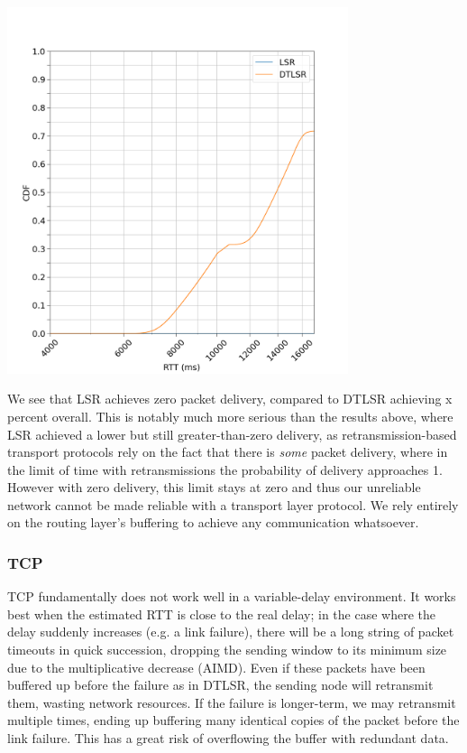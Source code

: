 \documentclass[10pt,twoside,a4paper]{article}
\begin{document}
\begin{minipage}{1\textwidth} \centering
	\includegraphics[width=0.75\textwidth]{delay_full_partition_flap5}
\end{minipage}

We see that LSR achieves zero packet delivery, compared to DTLSR achieving x percent overall. This is notably much more serious than the results above, where LSR achieved a lower but still greater-than-zero delivery, as retransmission-based transport protocols rely on the fact that there is \textit{some} packet delivery, where in the limit of time with retransmissions the probability of delivery approaches 1. However with zero delivery, this limit stays at zero and thus our unreliable network cannot be made reliable with a transport layer protocol. We rely entirely on the routing layer's buffering to achieve any communication whatsoever.

\subsubsection{TCP}

TCP fundamentally does not work well in a variable-delay environment. It works best when the estimated RTT is close to the real delay; in the case where the delay suddenly increases (e.g. a link failure), there will be a long string of packet timeouts in quick succession, dropping the sending window to its minimum size due to the multiplicative decrease (AIMD). Even if these packets have been buffered up before the failure as in DTLSR, the sending node will retransmit them, wasting network resources. If the failure is longer-term, we may retransmit multiple times, ending up buffering many identical copies of the packet before the link failure. This has a great risk of overflowing the buffer with redundant data.
\end{document}
